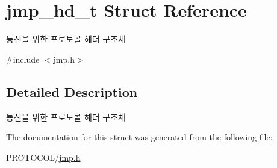 \hypertarget{structjmp__hd__t}{\section{jmp\-\_\-hd\-\_\-t Struct Reference}
\label{structjmp__hd__t}
}


통신을 위한 프로토콜 헤더 구조체  




{\ttfamily \#include $<$jmp.\-h$>$}



\subsection{Detailed Description}
통신을 위한 프로토콜 헤더 구조체 

The documentation for this struct was generated from the following file\-:\begin{DoxyCompactItemize}
\item 
P\-R\-O\-T\-O\-C\-O\-L/\hyperlink{jmp_8h}{jmp.\-h}\end{DoxyCompactItemize}
